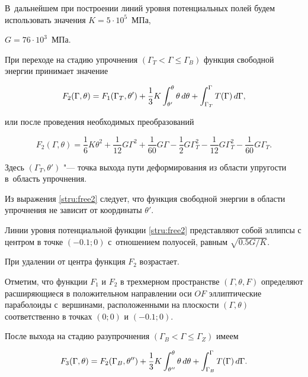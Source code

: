 В~дальнейшем при построении линий уровня потенциальных полей будем использовать значения $K=5\cdot 10^5$~МПа, 

$G=76\cdot10^3$~МПа.



При переходе на стадию упрочнения $(\Gamma_T < \Gamma \leq \Gamma_B)$ функция свободной энергии принимает значение

\begin{equation}

F_2(\Gamma, \theta)=F_1(\Gamma_T,\theta')+\frac13 K\int_{\theta'}^\theta \theta\,d\theta +\int_{\Gamma_{T}}^\Gamma T(\Gamma)\,d\Gamma, \notag

\end{equation}

или после проведения необходимых преобразований

\begin{equation}

F_2(\Gamma, \theta)=\frac16 K\theta^2 +

\frac{1}{12}G\Gamma^2+\frac{1}{60}G\Gamma-\frac12 G\Gamma_T^2-\frac{1}{12}G\Gamma_T^2-\frac{1}{60}G\Gamma_T. \label{stru:free2}

\end{equation}

Здесь $(\Gamma_T,\theta')$ "--- точка выхода пути деформирования из области упругости в~область упрочнения. 

Из выражения \eqref{stru:free2} следует, что функция свободной энергии в области упрочнения не зависит от координаты $\theta'$. 

Линии уровня потенциальной функции \eqref{stru:free2} представляют собой эллипсы с центром в точке $(-0.1; 0)$ с~отношением полуосей, равным $\sqrt{0.5G / K}$. 

При удалении от центра функция $F_2$ возрастает.



Отметим, что функции $F_1$ и $F_2$ в трехмерном пространстве $(\Gamma,\theta,F)$ определяют расширяющиеся в положительном направлении оси $OF$ эллиптические параболоиды с~вершинами, расположенными на плоскости $(\Gamma,\theta)$ соответственно в точках $(0; 0)$ и $(-0.1; 0)$.



После выхода на стадию разупрочнения $(\Gamma_B < \Gamma \leq \Gamma_Z)$ имеем

\begin{equation}

F_3(\Gamma, \theta)=F_2(\Gamma_B,\theta'')+\frac13 K\int_{\theta''}^\theta \theta\,d\theta +\int_{\Gamma_{B}}^\Gamma T(\Gamma)\,d\Gamma. \notag

\end{equation}

